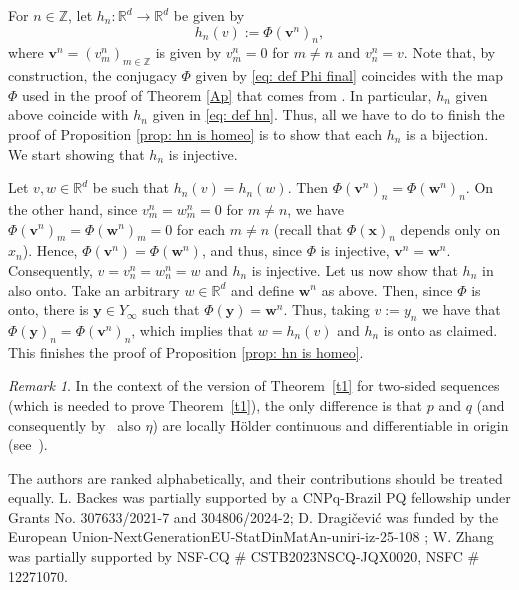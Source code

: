 \documentclass[reqno, a4paper, 10pt]{amsart}
\theoremstyle{plain}
\numberwithin{equation}{section}
\theoremstyle{remark}
\newtheorem{remark}{Remark}
\def\R{\mathbb{R}}
\begin{document}
For $n\in \mathbb Z$, let $h_n\colon \R^d \to \R ^d$ be given by 
\[
h_n(v):=\Phi(\mathbf v^n)_n,
\]
where $\mathbf v^n=(v_m^n)_{m\in \mathbb Z}$ is given by $v_m^n=0$ for $m\neq n$ and $v_n^n=v$. Note that, by construction, the conjugacy $\Phi$ given by \eqref{eq: def Phi final} coincides with the map $\Phi$ used in the proof of Theorem \ref{Ap} that comes from \cite[Appendix A]{DZZ}. In particular, $h_n$ given above coincide with $h_n$ given in \eqref{eq: def hn}. Thus, all we have to do to finish the proof of Proposition \ref{prop: hn is homeo} is to show that each $h_n$ is a bijection. We start showing that $h_n$ is injective. 

Let $v, w\in \R^d$ be such that $h_n(v)=h_n(w)$. Then $\Phi(\mathbf v^n)_n=\Phi(\mathbf w^n)_n$. On the other hand, since $v_m^n=w_m^n=0$ for $m\neq n$, we have $\Phi(\mathbf v^n)_m=\Phi(\mathbf w^n)_m=0$ for each $m\neq n$ (recall that $\Phi(\mathbf x)_n$ depends only on $x_n$). Hence, $\Phi(\mathbf v^n)=\Phi(\mathbf w^n)$, and thus, since $\Phi$ is injective, $\mathbf v^n=\mathbf w^n$. Consequently,  $v=v_n^n=w_n^n=w$ and $h_n$ is injective. Let us now show that $h_n$ in also onto. Take an arbitrary $w\in \R^d$ and define $\mathbf w^n$ as above. Then, since $\Phi$ is onto, there is $\mathbf y\in Y_\infty$ such that $\Phi(\mathbf y)=\mathbf w^n$. Thus, taking $v:=y_n$ we have that $\Phi(\mathbf y)_n=\Phi(\mathbf v^n)_n$, which implies that $w=h_n(v)$ and $h_n$ is onto as claimed. This finishes the proof of Proposition \ref{prop: hn is homeo}.

\begin{remark}\label{855rem}
In the context of the version of Theorem~\ref{t1} for two-sided sequences (which is needed to prove Theorem~\ref{t1}), the only difference is that $p$ and $q$ (and consequently by~\cite[Lemma 3.1]{BT} also $\eta$) are locally H\"older continuous and differentiable in origin (see~\cite[Lemma 4]{DZZ20}).
\end{remark}











The authors are ranked alphabetically, and their contributions should be treated equally. L. Backes was partially supported by a CNPq-Brazil PQ fellowship under Grants No. 307633/2021-7 and 304806/2024-2; D. Dragi\v cevi\'c was funded by the European Union-NextGenerationEU-StatDinMatAn-uniri-iz-25-108
; W. Zhang was partially supported by  NSF-CQ \# CSTB2023NSCQ-JQX0020, NSFC \# 12271070.
\end{document}
